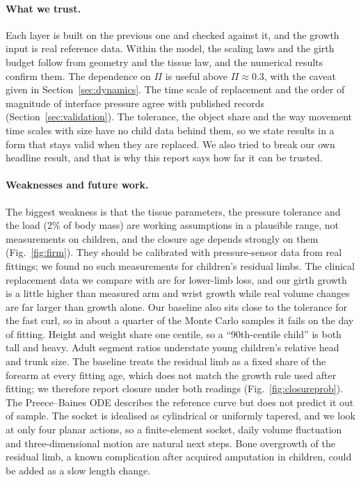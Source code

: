 \documentclass[11pt]{article}
\begin{document}
\paragraph{What we trust.} Each layer is built on the previous one and checked against it, and the growth input is real reference data. Within the model, the scaling laws and the girth budget follow from geometry and the tissue law, and the numerical results confirm them. The dependence on $\Pi$ is useful above $\Pi\approx0.3$, with the caveat given in Section~\ref{sec:dynamics}. The time scale of replacement and the order of magnitude of interface pressure agree with published records (Section~\ref{sec:validation}). The tolerance, the object share and the way movement time scales with size have no child data behind them, so we state results in a form that stays valid when they are replaced. We also tried to break our own headline result, and that is why this report says how far it can be trusted.

\paragraph{Weaknesses and future work.} The biggest weakness is that the tissue parameters, the pressure tolerance and the load (2\% of body mass) are working assumptions in a plausible range, not measurements on children, and the closure age depends strongly on them (Fig.~\ref{fig:firm}). They should be calibrated with pressure-sensor data from real fittings; we found no such measurements for children's residual limbs. The clinical replacement data we compare with are for lower-limb loss, and our girth growth is a little higher than measured arm and wrist growth while real volume changes are far larger than growth alone. Our baseline also sits close to the tolerance for the fast curl, so in about a quarter of the Monte Carlo samples it fails on the day of fitting. Height and weight share one centile, so a ``90th-centile child'' is both tall and heavy. Adult segment ratios understate young children's relative head and trunk size. The baseline treats the residual limb as a fixed share of the forearm at every fitting age, which does not match the growth rule used after fitting; we therefore report closure under both readings (Fig.~\ref{fig:closureprob}). The Preece--Baines ODE describes the reference curve but does not predict it out of sample. The socket is idealised as cylindrical or uniformly tapered, and we look at only four planar actions, so a finite-element socket, daily volume fluctuation and three-dimensional motion are natural next steps. Bone overgrowth of the residual limb, a known complication after acquired amputation in children, could be added as a slow length change.
\end{document}
